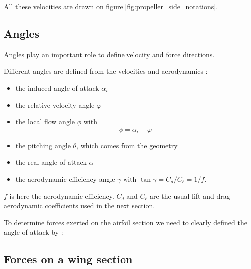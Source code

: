   All these velocities are drawn on figure  \ref{fig:propeller_side_notations}.


\subsection{Angles}

Angles play an important role to define velocity and force directions.

Different angles are defined from the velocities and aerodynamics :
\begin{itemize}
  \item the induced angle of attack $\alpha_i$
  \item the relative velocity angle $\varphi$
  \item the local flow angle $\phi$ with 
  $$
  \phi = \alpha_i  + \varphi
  $$
  \item the pitching angle $\theta$, which comes from the geometry
  \item the real angle of attack $\alpha$
  \item the aerodynamic efficiency angle $\gamma$ with $\tan \gamma = C_d/C_\ell = 1/f$.
\end{itemize}

$f$ is here the aerodynamic efficiency. $C_d$ and $C_{\ell}$ are the usual lift and drag aerodynamic 
coefficients  used in the next section.


To determine forces exerted on the airfoil section we need to clearly defined the angle of attack  by :

\Important{
\begin{equation}
\alpha = \theta-\phi
\label{eq:alpha_prop}
\end{equation}
}


\subsection{Forces on a wing section}

